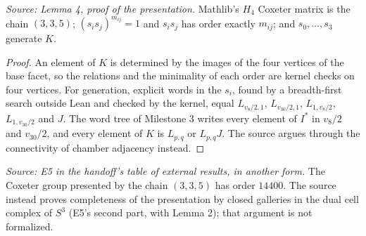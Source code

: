 \begin{theorem}
  \label{thm:coxeter-relations}
  \leanok
  \textit{Source: Lemma 4, proof of the presentation.}
  Mathlib's \(H_4\) Coxeter matrix is the chain \((3,3,5)\);
  \((s_is_j)^{m_{ij}}=1\) and \(s_is_j\) has order exactly \(m_{ij}\); and
  \(s_0,\ldots,s_3\) generate \(K\).
\end{theorem}
\begin{proof}
  \leanok
  An element of \(K\) is determined by the images of the four vertices of
  the base facet, so the relations and the minimality of each order are
  kernel checks on four vertices. For generation, explicit words in the
  \(s_i\), found by a breadth-first search outside Lean and checked by the
  kernel, equal \(L_{v_8/2,1}\), \(L_{v_{30}/2,1}\), \(L_{1,v_8/2}\),
  \(L_{1,v_{30}/2}\) and \(J\). The word tree of Milestone 3 writes every
  element of \(I^*\) in \(v_8/2\) and \(v_{30}/2\), and every element of
  \(K\) is \(L_{p,q}\) or \(L_{p,q}J\). The source argues through the
  connectivity of chamber adjacency instead.
\end{proof}

\begin{definition}[E5 as a hypothesis]
  \label{def:coxeter-sources}
  \leanok
  \textit{Source: E5 in the handoff's table of external results, in another
  form.}
  The Coxeter group presented by the chain \((3,3,5)\) has order
  \(14400\). The source instead proves completeness of the presentation by
  closed galleries in the dual cell complex of \(S^3\) (E5's second part,
  with Lemma 2); that argument is not formalized.
\end{definition}

